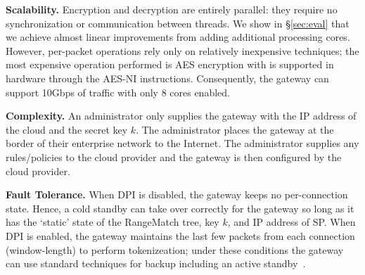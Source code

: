 {\noindent\textbf{Scalability.}
Encryption and decryption are entirely parallel: they require no synchronization or communication between threads. We show in \S\ref{sec:eval} that we achieve almost linear improvements from adding additional processing cores.
However, per-packet operations rely only on relatively inexpensive techniques; the most expensive operation performed is AES encryption with is supported in hardware through the AES-NI instructions. 
Consequently, the gateway can support 10Gbps of traffic with only 8 cores enabled.

\noindent\textbf{Complexity.}
An administrator only supplies the gateway with the IP address of the cloud and the secret key $k$.
The administrator places the gateway at the border of their enterprise network to the Internet.
The administrator supplies any rules/policies to the cloud provider and the gateway is then configured by the cloud provider.

\noindent\textbf{Fault Tolerance.}
When DPI is disabled, the gateway keeps no per-connection state. Hence, a cold standby can take over correctly for the gateway so long as it has the `static' state of the RangeMatch tree, key $k$, and IP address of SP.
When DPI is enabled, the gateway maintains the last few packets from each connection (window-length) to perform tokenizeation; under these conditions the gateway can use standard techniques for backup including an active standby~\cite{colo}.
}

